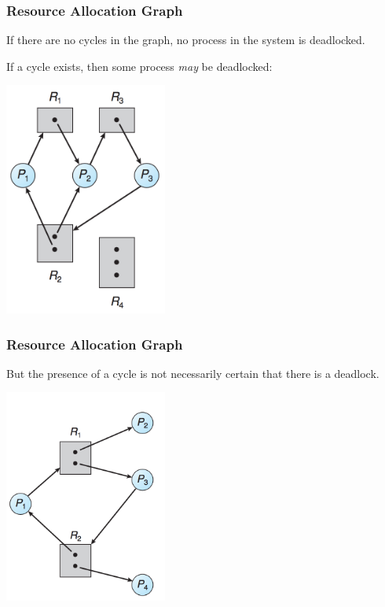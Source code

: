 \begin{frame}
\frametitle{Resource Allocation Graph}

If there are no cycles in the graph, no process in the system is deadlocked. 

If a cycle exists, then some process \textit{may} be deadlocked:

\begin{center}
\includegraphics[width=0.40\textwidth]{images/rag2.png}
\end{center}

\end{frame}

\begin{frame}
\frametitle{Resource Allocation Graph}

But the presence of a cycle is not necessarily certain that there is a deadlock.

\begin{center}
\includegraphics[width=0.40\textwidth]{images/rag3.png}
\end{center}


\end{frame}

